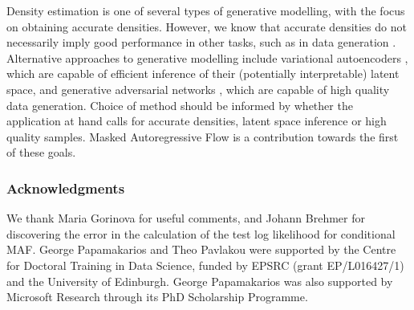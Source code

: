 Density estimation is one of several types of generative modelling, with the focus on obtaining accurate densities. However, we know that accurate densities do not necessarily imply good performance in other tasks, such as in data generation \citep{Theis:2016}. Alternative approaches to generative modelling include variational autoencoders \citep{Kingma:2014, Rezende:2014}, which are capable of efficient inference of their (potentially interpretable) latent space, and generative adversarial networks \citep{Goodfellow:2014}, which are capable of high quality data generation. Choice of method should be informed by whether the application at hand calls for accurate densities, latent space inference or high quality samples. Masked Autoregressive Flow is a contribution towards the first of these goals.

\ifanonymize
\else
\subsubsection*{Acknowledgments}

We thank Maria Gorinova for useful comments, and Johann Brehmer for discovering the error in the calculation of the test log likelihood for conditional MAF\@.
George Papamakarios and Theo Pavlakou were supported by the Centre for Doctoral Training in Data Science, funded by EPSRC (grant EP/L016427/1) and the University of Edinburgh. George Papamakarios was also supported by Microsoft Research through its PhD Scholarship Programme.
\fi
